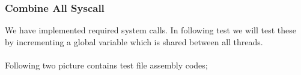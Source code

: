 \documentclass{article}
\begin{document}
\subsubsection{Combine All Syscall}
We have implemented required system calls. In following test we will test these by incrementing a global variable which is shared between all threads. \\ \\
Following two picture contains test file assembly codes; 
\begin{figure}[H]
    \centering
    \qquad

\end{figure}
\end{document}
